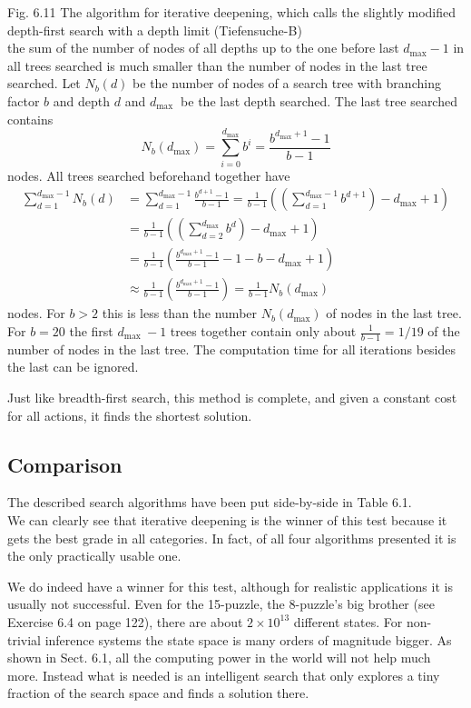 \documentclass[10pt]{book}
\begin{document}
Fig. 6.11 The algorithm for iterative deepening, which calls the slightly modified depth-first search with a depth limit (Tiefensuche-B)\\
the sum of the number of nodes of all depths up to the one before last $d_{\text{max}} - 1$ in all trees searched is much smaller than the number of nodes in the last tree searched.
Let $N_{b}(d)$ be the number of nodes of a search tree with branching factor $b$ and depth $d$ and $d_{\text {max }}$ be the last depth searched. The last tree searched contains
\[
N_{b}\left(d_{\max }\right)=\sum_{i=0}^{d_{\max }} b^{i}=\frac{b^{d_{\max }+1}-1}{b-1}
\]
nodes. All trees searched beforehand together have
\[
\begin{aligned}
\sum_{d=1}^{d_{\max }-1} N_{b}(d) & =\sum_{d=1}^{d_{\max }-1} \frac{b^{d+1}-1}{b-1}=\frac{1}{b-1}\left(\left(\sum_{d=1}^{d_{\max }-1} b^{d+1}\right)-d_{\max }+1\right) \\
& =\frac{1}{b-1}\left(\left(\sum_{d=2}^{d_{\max }} b^{d}\right)-d_{\max }+1\right) \\
& =\frac{1}{b-1}\left(\frac{b^{d_{\max }+1}-1}{b-1}-1-b-d_{\max }+1\right) \\
& \approx \frac{1}{b-1}\left(\frac{b^{d_{\max }+1}-1}{b-1}\right)=\frac{1}{b-1} N_{b}\left(d_{\max }\right)
\end{aligned}
\]
nodes. For $b>2$ this is less than the number $N_{b}\left(d_{\max }\right)$ of nodes in the last tree. For $b=20$ the first $d_{\text {max }}-1$ trees together contain only about $\frac{1}{b-1}=1 / 19$ of the number of nodes in the last tree. The computation time for all iterations besides the last can be ignored.

Just like breadth-first search, this method is complete, and given a constant cost for all actions, it finds the shortest solution.

\subsection{Comparison}
The described search algorithms have been put side-by-side in Table 6.1.\\
We can clearly see that iterative deepening is the winner of this test because it gets the best grade in all categories. In fact, of all four algorithms presented it is the only practically usable one.

We do indeed have a winner for this test, although for realistic applications it is usually not successful. Even for the 15-puzzle, the 8-puzzle's big brother (see Exercise 6.4 on page 122), there are about $2 \times 10^{13}$ different states. For non-trivial inference systems the state space is many orders of magnitude bigger. As shown in Sect. 6.1, all the computing power in the world will not help much more. Instead what is needed is an intelligent search that only explores a tiny fraction of the search space and finds a solution there.
\end{document}
